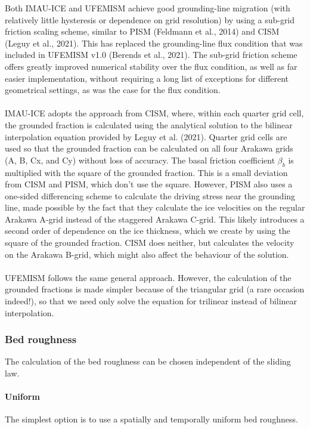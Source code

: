 \documentclass{article}
\begin{document}
Both IMAU-ICE and UFEMISM achieve good grounding-line migration (with relatively little hysteresis or dependence on grid resolution) by using a sub-grid friction scaling scheme, similar to PISM (Feldmann et al., 2014) and CISM (Leguy et al., 2021). This has replaced the grounding-line flux condition that was included in UFEMISM v1.0 (Berends et al., 2021). The sub-grid friction scheme offers greatly improved numerical stability over the flux condition, as well as far easier implementation, without requiring a long list of exceptions for different geometrical settings, as was the case for the flux condition.\\
\\
IMAU-ICE adopts the approach from CISM, where, within each quarter grid cell, the grounded fraction is calculated using the analytical solution to the bilinear interpolation equation provided by Leguy et al. (2021). Quarter grid cells are used so that the grounded fraction can be calculated on all four Arakawa grids (A, B, Cx, and Cy) without loss of accuracy. The basal friction coefficient $\beta_b$ is multiplied with the square of the grounded fraction. This is a small deviation from CISM and PISM, which don't use the square. However, PISM also uses a one-sided differencing scheme to calculate the driving stress near the grounding line, made possible by the fact that they calculate the ice velocities on the regular Arakawa A-grid instead of the staggered Arakawa C-grid. This likely introduces a second order of dependence on the ice thickness, which we create by using the square of the grounded fraction. CISM does neither, but calculates the velocity on the Arakawa B-grid, which might also affect the behaviour of the solution.\\
\\
UFEMISM follows the same general approach. However, the calculation of the grounded fractions is made simpler because of the triangular grid (a rare occasion indeed!), so that we need only solve the equation for trilinear instead of bilinear interpolation.

\subsubsection{Bed roughness}

The calculation of the bed roughness can be chosen independent of the sliding law.

\paragraph{Uniform}
The simplest option is to use a spatially and temporally uniform bed roughness.
\end{document}
